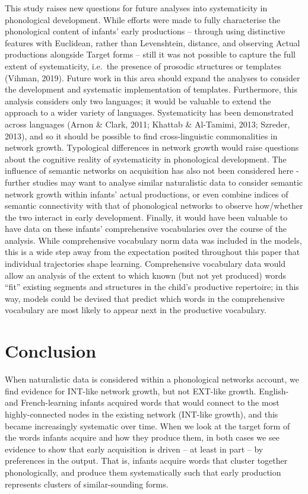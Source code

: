 \documentclass[
  man]{apa6}
\begin{document}
This study raises new questions for future analyses into systematicity in phonological development. While efforts were made to fully characterise the phonological content of infants' early productions -- through using distinctive features with Euclidean, rather than Levenshtein, distance, and observing Actual productions alongside Target forms -- still it was not possible to capture the full extent of systematicity, i.e.~the presence of prosodic structures or templates (Vihman, 2019). Future work in this area should expand the analyses to consider the development and systematic implementation of templates. Furthermore, this analysis considers only two languages; it would be valuable to extend the approach to a wider variety of languages. Systematicity has been demonstrated across languages (Arnon \& Clark, 2011; Khattab \& Al-Tamimi, 2013; Szreder, 2013), and so it should be possible to find cross-linguistic commonalities in network growth. Typological differences in network growth would raise questions about the cognitive reality of systematicity in phonological development. The influence of semantic networks on acquisition has also not been considered here - further studies may want to analyse similar naturalistic data to consider semantic network growth within infants' actual productions, or even combine indices of semantic connectivity with that of phonological networks to observe how/whether the two interact in early development. Finally, it would have been valuable to have data on these infants' comprehensive vocabularies over the course of the analysis. While comprehensive vocabulary norm data was included in the models, this is a wide step away from the expectation posited throughout this paper that individual trajectories shape learning. Comprehensive vocabulary data would allow an analysis of the extent to which known (but not yet produced) words ``fit'' existing segments and structures in the child's productive repertoire; in this way, models could be devised that predict which words in the comprehensive vocabulary are most likely to appear next in the productive vocabulary.

\hypertarget{conclusion}{%
\section{Conclusion}\label{conclusion}}

When naturalistic data is considered within a phonological networks account, we find evidence for INT-like network growth, but not EXT-like growth. English- and French-learning infants acquired words that would connect to the most highly-connected nodes in the existing network (INT-like growth), and this became increasingly systematic over time. When we look at the target form of the words infants acquire and how they produce them, in both cases we see evidence to show that early acquisition is driven -- at least in part -- by preferences in the output. That is, infants acquire words that cluster together phonologically, and produce them systematically such that early production represents clusters of similar-sounding forms.
\end{document}
